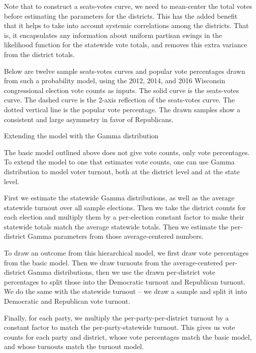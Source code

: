 \documentclass[preprint,12pt]{article}
\begin{document}
Note that to construct a seats-votes curve, we need to mean-center the total votes before estimating the parameters for the districts.  This has the added benefit that it helps to take into account systemic correlations among the districts.  That is, it encapsulates any information about uniform partisan swings in the likelihood function for the statewide vote totals, and removes this extra variance from the district totals.
 

 
Below are twelve sample seats-votes curves and popular vote percentages drawn from such a probability model, using the 2012, 2014, and 2016 Wisconsin congressional election vote counts as inputs.  The solid curve is the seats-votes curve.  The dashed curve is the 2-axis reflection of the seats-votes curve.  The dotted vertical line is the popular vote percentage.  The drawn samples show a consistent and large asymmetry in favor of Republicans.

 
 
Extending the model with the Gamma distribution
 
The basic model outlined above does not give vote counts, only vote percentages.  To extend the model to one that estimates vote counts, one can use Gamma distribution to model voter turnout, both at the district level and at the state level.
 
First we estimate the statewide Gamma distributions, as well as the average statewide turnout over all sample elections.   Then we take the district counts for each election and multiply them by a per-election constant factor to make their statewide totals match the average statewide totals.  Then we estimate the per-district Gamma parameters from those average-centered numbers.
 
To draw an outcome from this hierarchical model, we first draw vote percentages from the basic model. Then we draw turnouts from the average-centered per-district Gamma distributions, then we use the drawn per-district vote percentages to split those into the Democratic turnout and Republican turnout.  We do the same with the statewide turnout -- we draw a sample and split it into Democratic and Republican vote turnout. 
 
Finally, for each party, we multiply the per-party-per-district turnout by a constant factor to match the per-party-statewide turnout.  This gives us vote counts for each party and district, whose vote percentages match the basic model, and whose turnouts match the turnout model.
 
\end{document}
